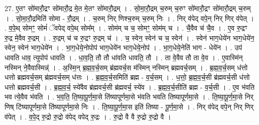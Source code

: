 \documentclass[17pt]{extarticle}
\begin{document}
27. ए॒तꣳ सो॑मारौ॒द्रꣳ सो॑मारौ॒द्र मे॒त मे॒तꣳ सो॑मारौ॒द्रम् । . सो॒मा॒रौ॒द्रम् च॒रुम् च॒रुꣳ सो॑मारौ॒द्रꣳ सो॑मारौ॒द्रम् च॒रुम् । . सो॒मा॒रौ॒द्रमिति॑ सोमा - रौ॒द्रम् । . च॒रुम् निर् णिश्च॒रुम् च॒रुम् निः । . निर् व॑पेद् वपे॒न् निर् णिर् व॑पेत् । . व॒पे॒थ् सोमꣳ॒॒ सोमं॑ ॅवपेद् वपे॒थ् सोम᳚म् । . सोम॑म् च च॒ सोमꣳ॒॒ सोम॑म् च । . चै॒वैव च॑ चै॒व । . ए॒व रु॒द्रꣳ रु॒द्र मे॒वैव रु॒द्रम् । . रु॒द्रम् च॑ च रु॒द्रꣳ रु॒द्रम् च॑ । . च॒ स्वेन॒ स्वेन॑ च च॒ स्वेन॑ । . स्वेन॑ भाग॒धेये॑न भाग॒धेये॑न॒ स्वेन॒ स्वेन॑ भाग॒धेये॑न । . भा॒ग॒धेये॒नोपोप॑ भाग॒धेये॑न भाग॒धेये॒नोप॑ । . भा॒ग॒धेये॒नेति॑ भाग - धेये॑न । . उप॑ धावति धाव॒ त्युपोप॑ धावति । . धा॒व॒ति॒ तौ तौ धा॑वति धावति॒ तौ । . ता वे॒वैव तौ ता वे॒व । . ए॒वास्मि॑न् नस्मिन् ने॒वैवास्मिन्न्॑ । . अ॒स्मि॒न् ब्र॒ह्म॒व॒र्च॒सम् ब्र॑ह्मवर्च॒स म॑स्मिन् नस्मिन् ब्रह्मवर्च॒सम् । . ब्र॒ह्म॒व॒र्च॒सम् ध॑त्तो धत्तो ब्रह्मवर्च॒सम् ब्र॑ह्मवर्च॒सम् ध॑त्तः । . ब्र॒ह्म॒व॒र्च॒समिति॑ ब्रह्म - व॒र्च॒सम् । . ध॒त्तो॒ ब्र॒ह्म॒व॒र्च॒सी ब्र॑ह्मवर्च॒सी ध॑त्तो धत्तो ब्रह्मवर्च॒सी । . ब्र॒ह्म॒व॒र्च॒ स्ये॑वैव ब्र॑ह्मवर्च॒सी ब्र॑ह्मवर्च॒ स्ये॑व । . ब्र॒ह्म॒व॒र्च॒सीति॑ ब्रह्म - व॒र्च॒सी । . ए॒व भ॑वति भव त्ये॒वैव भ॑वति । . भ॒व॒ति॒ ति॒ष्या॒पू॒र्ण॒मा॒से ति॑ष्यापूर्णमा॒से भ॑वति भवति तिष्यापूर्णमा॒से । . ति॒ष्या॒पू॒र्ण॒मा॒से निर् णिष् टि॑ष्यापूर्णमा॒से ति॑ष्यापूर्णमा॒से निः । . ति॒ष्या॒पू॒र्ण॒मा॒स इति॑ तिष्या - पू॒र्ण॒मा॒से । . निर् व॑पेद् वपे॒न् निर् णिर् व॑पेत् । . व॒पे॒द् रु॒द्रो रु॒द्रो व॑पेद् वपेद् रु॒द्रः । . रु॒द्रो वै वै रु॒द्रो रु॒द्रो वै । \newline
\end{document}
